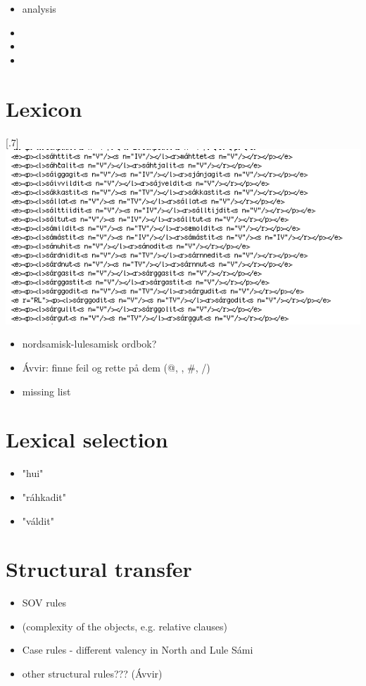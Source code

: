 \documentclass[a4paper,english,12pt]{article}
\begin{document}
\begin{spacing}{1.0}
\begin{itemize}
\item analysis
\item 
\item 
\item 
\end{itemize}

\section{Lexicon}

\scalebox{.7}[.7]{\includegraphics{bidix.png}}

\begin{itemize}
\item nordsamisk-lulesamisk ordbok?
\item Ávvir: finne feil og rette på dem (@, \*, \#, /)
\item missing list
\end{itemize}

\section{Lexical selection}
\begin{itemize}
\item "hui"
\item "ráhkadit"
\item "váldit"
\end{itemize}


\section{Structural transfer} 
\begin{itemize}
  \item SOV rules
  \item (complexity of the objects, e.g. relative clauses)
  \item Case rules - different valency in North and Lule Sámi
  \item other structural rules??? (Ávvir)
\end{itemize}



\end{spacing}
\end{document}
